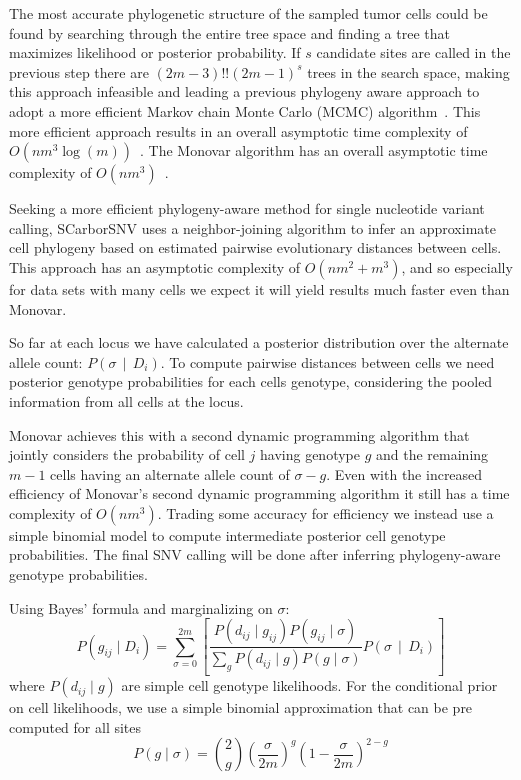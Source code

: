 \documentclass[../../main.tex]{subfiles}
\begin{document}
The most accurate phylogenetic structure of the sampled tumor cells could be found by searching through the entire tree space and finding a tree that maximizes likelihood or posterior probability.
If $s$ candidate sites are called in the previous step there are $(2m-3)!!(2m-1)^s$ trees in the search space, making this approach infeasible and leading a previous phylogeny aware approach to adopt a more efficient Markov chain Monte Carlo (MCMC) algorithm~\cite{sciphi}.
This more efficient approach results in an overall asymptotic time complexity of $O(nm^3\log(m))$~\cite{sciphi}.
The Monovar algorithm has an overall asymptotic time complexity of $O(nm^3)$~\cite{monovar}.

Seeking a more efficient phylogeny-aware method for single nucleotide variant calling, SCarborSNV uses a neighbor-joining algorithm to infer an approximate cell phylogeny based on estimated pairwise evolutionary distances between cells.
This approach has an asymptotic complexity of $O(nm^2+m^3)$, and so especially for data sets with many cells we expect it will yield results much faster even than Monovar.

So far at each locus we have calculated a posterior distribution over the alternate allele count: $P(\sigma\,\mid\,D_i)$.
To compute pairwise distances between cells we need posterior genotype probabilities for each cells genotype, considering the pooled information from all cells at the locus.

Monovar achieves this with a second dynamic programming algorithm that jointly considers the probability of cell $j$ having genotype $g$ and the remaining $m-1$ cells having an alternate allele count of $\sigma - g$.
Even with the increased efficiency of Monovar's second dynamic programming algorithm it still has a time complexity of $O(nm^3)$.
Trading some accuracy for efficiency we instead use a simple binomial model to compute intermediate posterior cell genotype probabilities. 
The final SNV calling will be done after inferring phylogeny-aware genotype probabilities.

Using Bayes' formula and marginalizing on $\sigma$:
\begin{equation}\label{eq:posteriorgenotypes}
P(g_{ij}\mid D_i) = \sum_{\sigma=0}^{2m}  \left[ \frac{P(d_{ij}\mid g_{ij})P(g_{ij}\mid \sigma)}{\sum_g P(d_{ij}\mid g)P(g \mid \sigma)}  P(\sigma\,\mid\,D_i)\right]
\end{equation}
where $P(d_{ij}\mid g)$ are simple cell genotype likelihoods.
For the conditional prior on cell likelihoods, we use a simple binomial approximation that can be pre computed for all sites
\begin{equation*}
P(g\mid \sigma) = \binom{2}{g} \left(\frac{\sigma}{2m}\right)^g \left(1-\frac{\sigma}{2m}\right)^{2-g}
\end{equation*}
\end{document}
